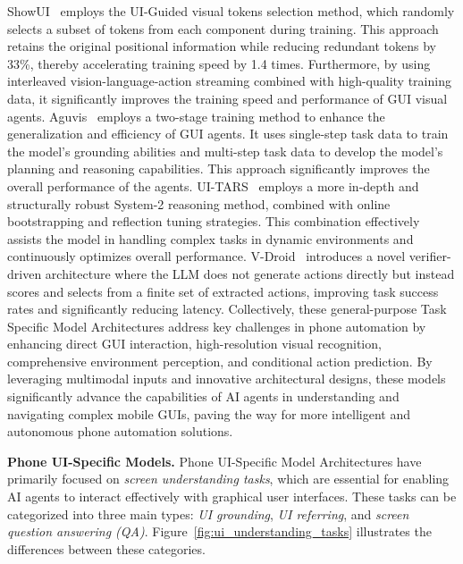 ShowUI~\cite{lin2024showui} employs the UI-Guided visual tokens selection method, which randomly selects a subset of tokens from each component during training. This approach retains the original positional information while reducing redundant tokens by 33\%, thereby accelerating training speed by 1.4 times. Furthermore, by using interleaved vision-language-action streaming combined with high-quality training data, it significantly improves the training speed and performance of GUI visual agents. Aguvis~\cite{xu2024aguvis} employs a two-stage training method to enhance the generalization and efficiency of GUI agents. It uses single-step task data to train the model's grounding abilities and multi-step task data to develop the model's planning and reasoning capabilities. This approach significantly improves the overall performance of the agents.
UI-TARS~\cite{qin2025ui} employs a more in-depth and structurally robust System-2 reasoning method, combined with online bootstrapping and reflection tuning strategies. This combination effectively assists the model in handling complex tasks in dynamic environments and continuously optimizes overall performance.
V-Droid~\cite{dai2025advancing} introduces a novel verifier-driven architecture where the LLM does not generate actions directly but instead scores and selects from a finite set of extracted actions, improving task success rates and significantly reducing latency.
Collectively, these general-purpose Task Specific Model Architectures address key challenges in phone automation by enhancing direct GUI interaction, high-resolution visual recognition, comprehensive environment perception, and conditional action prediction. By leveraging multimodal inputs and innovative architectural designs, these models significantly advance the capabilities of AI agents in understanding and navigating complex mobile GUIs, paving the way for more intelligent and autonomous phone automation solutions.


\noindent\textbf{Phone UI-Specific Models.}
Phone UI-Specific Model Architectures have primarily focused on \textit{screen understanding tasks}, which are essential for enabling AI agents to interact effectively with graphical user interfaces. These tasks can be categorized into three main types: \textit{UI grounding}, \textit{UI referring}, and \textit{screen question answering (QA)}. Figure~\ref{fig:ui_understanding_tasks} illustrates the differences between these categories.


